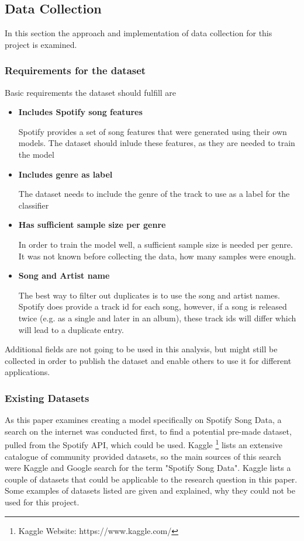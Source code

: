 \subsection{Data Collection}
\label{sec:Data Collection}

In this section the approach and implementation of data collection for this project is 
examined.

\subsubsection{Requirements for the dataset}

Basic requirements the dataset should fulfill are

\begin{itemize}
    \item \textbf{Includes Spotify song features}

    Spotify provides a set of song features that were generated using their own models.
    The dataset should inlude these features, as they are needed to train the model
    \item \textbf{Includes genre as label}

    The dataset needs to include the genre of the track to use as a label for the classifier
    \item \textbf{Has sufficient sample size per genre}

    In order to train the model well, a sufficient sample size is needed per genre.
    It was not known before collecting the data, how many samples were enough. 
    \item \textbf{Song and Artist name}

    The best way to filter out duplicates is to use the song and artist names.
    Spotify does provide a track id for each song, however, if a song is released twice
    (e.g. as a single and later in an album), these track ids will differ which will lead to a duplicate entry.
\end{itemize}

Additional fields are not going to be used in this analysis, but might still be collected in order to publish the
dataset and enable others to use it for different applications.

\subsubsection{Existing Datasets}

As this paper examines creating a model specifically on Spotify Song Data,
a search on the internet was conducted first, to find a potential pre-made dataset,
pulled from the Spotify \ac{API}, which could be used.
Kaggle \footnote{Kaggle Website: https://www.kaggle.com/} lists an extensive
catalogue of community provided datasets, so the main sources of this search were
Kaggle and Google search for the term "Spotify Song Data".
Kaggle lists a couple of datasets that could be applicable to the research question in
this paper. Some examples of datasets listed are given and explained, why they could not 
be used for this project.

